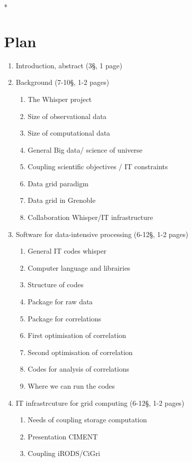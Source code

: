 \documentclass[a4paper, 10pt]{article}
\begin{document}
\begin{multicols}{2}
\/*
\section{Plan}
\begin{enumerate}
	\item Introduction, abstract (3\S , 1 page) 
  	\item Background (7-10\S, 1-2 pages)
    \begin{enumerate}
  	  \item The Whisper project
  	  \item Size of observational data
  	  \item Size of computational data
  	  \item General Big data/ science of  universe
  	  \item Coupling scientific objectives / IT constraints
  	  \item Data grid paradigm
  	  \item Data grid in Grenoble
  	  \item Collaboration Whisper/IT infrastructure
  	\end{enumerate}
  	\item Software for data-intensive processing (6-12\S , 1-2 pages)
  	\begin{enumerate}
      \item General IT codes whisper
      \item Computer language and librairies
      \item Structure of codes
      \item Package for raw data
      \item Package for correlations
      \item First optimisation of correlation
      \item Second optimisation of correlation
      \item Codes for analysis of correlations
      \item Where we can run the codes
    \end{enumerate}
  \item IT infrastrcuture for grid computing (6-12\S , 1-2 pages)
    \begin{enumerate}
  	  \item Needs of coupling storage computation
  	  \item Presentation CIMENT
  	  \item Coupling iRODS/CiGri

\end{enumerate}
\end{enumerate}
\end{multicols}
\end{document}
